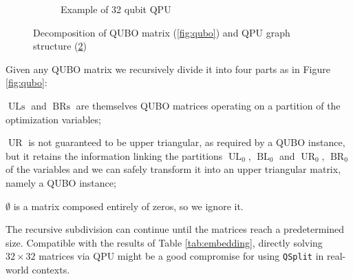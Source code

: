 \documentclass{ceurart}
\begin{document}
\begin{figure}
\begin{subfigure}[c]{0.54\textwidth}
{ 
        }  
        \caption{Example of 32 qubit QPU\cite{Pegasus}}
        \label{fig:pegasus}
    \end{subfigure}
    \caption{Decomposition of QUBO matrix (\ref{fig:qubo}) and QPU graph structure (\ref{fig:pegasus})}
\end{figure}

Given any QUBO matrix we recursively divide it into four parts as in Figure \ref{fig:qubo}:
\begin{enumerate*}[label=\arabic*)]
    \item $\operatorname{ULs}$ and $\operatorname{BRs}$ are themselves QUBO matrices operating on a partition of the optimization variables;
    \item $\operatorname{UR}$ is not guaranteed to be upper triangular, as required by a QUBO instance, but it retains the information linking the partitions $\operatorname{UL}_0$, $\operatorname{BL}_0$ and $\operatorname{UR}_0$, $\operatorname{BR}_0$ of the variables and we can safely transform it into an upper triangular matrix, namely a QUBO instance;
    \item $\emptyset$ is a matrix composed entirely of zeros, so we ignore it.
\end{enumerate*}

The recursive subdivision can continue until the matrices reach a predetermined size. Compatible with the results of Table \ref{tab:embedding}, directly solving $32 \times 32$ matrices via QPU might be a good compromise for using \verb|QSplit| in real-world contexts.
\end{document}
